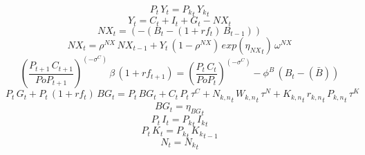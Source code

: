 \begin{dmath}
{P_{t}}\, {Y_{t}}={{P_k}_{t}}\, {{Y_k}_{t}}
\end{dmath}
\begin{dmath}
{Y_{t}}={C_{t}}+{I_{t}}+{G_{t}}-{NX_{t}}
\end{dmath}
\begin{dmath}
{NX_{t}}=\left(-\left({B_{t}}-\left(1+{rf_{t}}\right)\, {B_{t-1}}\right)\right)
\end{dmath}
\begin{dmath}
{NX_{t}}={{\rho^{NX}}}\, {NX_{t-1}}+{Y_{t}}\, \left(1-{{\rho^{NX}}}\right)\, exp\left({{\eta_{NX}}_{t}}\right)\, {{\omega^{NX}}}
\end{dmath}
\begin{dmath}
\left(\frac{{P_{t+1}}\, {C_{t+1}}}{{PoP_{t+1}}}\right)^{\left(-{{\sigma^{C}}}\right)}\, {{\beta}}\, \left(1+{rf_{t+1}}\right)=\left(\frac{{P_{t}}\, {C_{t}}}{{PoP_{t}}}\right)^{\left(-{{\sigma^{C}}}\right)}-{{\phi^{B}}}\, \left({B_{t}}-(\bar{B})\right)
\end{dmath}
\begin{dmath}
{P_{t}}\, {G_{t}}+{P_{t}}\, \left(1+{rf_{t}}\right)\, {BG_{t}}={P_{t}}\, {BG_{t}}+{C_{t}}\, {P_{t}}\, {{\tau^{C}}}+{{N_{k,n}}_{t}}\, {{W_{k,n}}_{t}}\, {{\tau^{N}}}+{{K_{k,n}}_{t}}\, {{r_{k,n}}_{t}}\, {{P_{k,n}}_{t}}\, {{\tau^{K}}}
\end{dmath}
\begin{dmath}
{BG_{t}}={{\eta_{BG}}_{t}}
\end{dmath}
\begin{dmath}
{P_{t}}\, {I_{t}}={{P_k}_{t}}\, {{I_k}_{t}}
\end{dmath}
\begin{dmath}
{P_{t}}\, {K_{t}}={{P_k}_{t}}\, {{K_k}_{t-1}}
\end{dmath}
\begin{dmath}
{N_{t}}={{N_k}_{t}}
\end{dmath}

